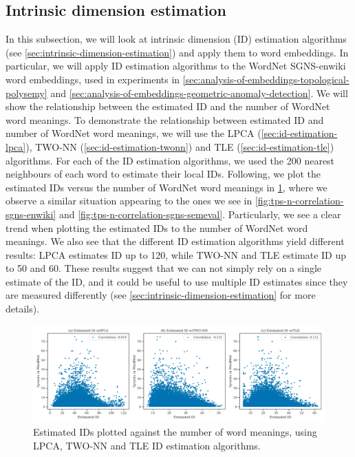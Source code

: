 \subsection{Intrinsic dimension estimation}
\label{sec:analysis-of-embeddings-intrinsic-dimension-estimation}
In this subsection, we will look at intrinsic dimension (ID) estimation algorithms (see \cref{sec:intrinsic-dimension-estimation}) and apply them to word embeddings. In particular, we will apply ID estimation algorithms to the WordNet SGNS-enwiki word embeddings, used in experiments in \cref{sec:analysis-of-embeddings-topological-polysemy} and \cref{sec:analysis-of-embeddings-geometric-anomaly-detection}. We will show the relationship between the estimated ID and the number of WordNet word meanings. To demonstrate the relationship between estimated ID and number of WordNet word meanings, we will use the LPCA (\cref{sec:id-estimation-lpca}), TWO-NN (\cref{sec:id-estimation-twonn}) and TLE (\cref{sec:id-estimation-tle}) algorithms. For each of the ID estimation algorithms, we used the 200 nearest neighbours of each word to estimate their local IDs. Following, we plot the estimated IDs versus the number of WordNet word meanings in \cref{fig:intrinsic-dimension-estimation-vs-wordnet-synsets}, where we observe a similar situation appearing to the ones we see in \cref{fig:tps-n-correlation-sgns-enwiki} and \cref{fig:tps-n-correlation-sgns-semeval}. Particularly, we see a clear trend when plotting the estimated IDs to the number of WordNet word meanings. We also see that the different ID estimation algorithms yield different results: LPCA estimates ID up to 120, while TWO-NN and TLE estimate ID up to 50 and 60. These results suggest that we can not simply rely on a single estimate of the ID, and it could be useful to use multiple ID estimates since they are measured differently (see \cref{sec:intrinsic-dimension-estimation} for more details).
\begin{figure}[H]
    \centering
    \includegraphics[width=\textwidth]{thesis/figures/intrinsic-dimension-estimation-vs-wordnet-synsets.pdf}
    \caption{Estimated IDs plotted against the number of word meanings, using LPCA, TWO-NN and TLE ID estimation algorithms.}
    \label{fig:intrinsic-dimension-estimation-vs-wordnet-synsets}
\end{figure}

